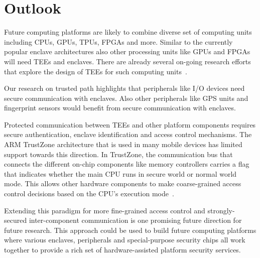 
\section*{Outlook}



Future computing platforms are likely to combine diverse set of computing units including CPUs, GPUs, TPUs, FPGAs and more. %
Similar to the currently popular enclave architectures also other processing units like GPUs and FPGAs will need TEEs and enclaves. There are already several on-going research efforts that explore the design of TEEs for such computing units~\cite{volos2018graviton}.

Our research on trusted path highlights that peripherals like I/O devices need secure communication with enclaves. Also other peripherals like GPS units and fingerprint sensors would benefit from secure communication with enclaves. 

Protected communication between TEEs and other platform components requires secure authentication, enclave identification and access control mechanisms. The ARM TrustZone architecture that is used in many mobile devices has limited support towards this direction. In TrustZone, the communication bus that connects the different on-chip components like memory controllers carries a flag that indicates whether the main CPU runs in secure world or normal world mode. This allows other hardware components to make coarse-grained access control decisions based on the CPU's execution mode~\cite{ekberg2014untapped}. 


Extending this paradigm for more fine-grained access control and strongly-secured inter-component communication is one promising future direction for future research. This approach could be used to build future computing platforms where various enclaves, peripherals and special-purpose security chips all work together to provide a rich set of hardware-assisted platform security services.
